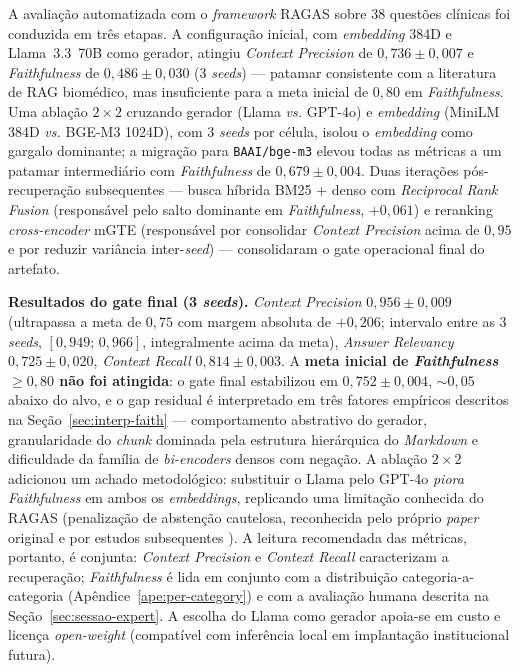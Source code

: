 \documentclass[
  12pt,
  oneside,
  a4paper,
  english,
  brazil
]{abntex2}
\begin{document}
A avaliação automatizada com o \emph{framework} RAGAS sobre 38 questões
clínicas foi conduzida em três etapas. A configuração inicial, com
\emph{embedding} 384D e Llama~3.3~70B como gerador, atingiu
\textit{Context Precision} de $0{,}736 \pm 0{,}007$ e
\textit{Faithfulness} de $0{,}486 \pm 0{,}030$ (3 \emph{seeds}) ---
patamar consistente com a literatura de RAG biomédico, mas insuficiente
para a meta inicial de $0{,}80$ em \textit{Faithfulness}. Uma ablação
$2 \times 2$ cruzando gerador (Llama \textit{vs.} GPT-4o) e
\emph{embedding} (MiniLM 384D \textit{vs.} BGE-M3 1024D), com 3
\emph{seeds} por célula, isolou o \emph{embedding} como gargalo
dominante; a migração para \texttt{BAAI/bge-m3} elevou todas as
métricas a um patamar intermediário com \textit{Faithfulness} de
$0{,}679 \pm 0{,}004$. Duas iterações pós-recuperação subsequentes ---
busca híbrida BM25 + denso com \textit{Reciprocal Rank Fusion}
(responsável pelo salto dominante em \textit{Faithfulness},
$+0{,}061$) e reranking \emph{cross-encoder} mGTE (responsável por
consolidar \textit{Context Precision} acima de $0{,}95$ e por reduzir
variância inter-\emph{seed}) --- consolidaram o gate operacional final
do artefato.

\textbf{Resultados do gate final (3 \emph{seeds}).}
\textit{Context Precision} $0{,}956 \pm 0{,}009$ (ultrapassa a meta de
$0{,}75$ com margem absoluta de $+0{,}206$; intervalo entre as 3
\emph{seeds}, $[0{,}949;\, 0{,}966]$, integralmente acima da meta),
\textit{Answer Relevancy} $0{,}725 \pm 0{,}020$, \textit{Context
Recall} $0{,}814 \pm 0{,}003$. A \textbf{meta inicial de
\textit{Faithfulness} $\geq 0{,}80$ não foi atingida}: o gate final
estabilizou em $0{,}752 \pm 0{,}004$, $\sim 0{,}05$ abaixo do alvo, e
o gap residual é interpretado em três fatores empíricos descritos na
Seção~\ref{sec:interp-faith} --- comportamento abstrativo do gerador,
granularidade do \emph{chunk} dominada pela estrutura hierárquica do
\emph{Markdown} e dificuldade da família de \emph{bi-encoders} densos
com negação. A ablação $2 \times 2$ adicionou um achado metodológico:
substituir o Llama pelo GPT-4o \emph{piora} \textit{Faithfulness} em
ambos os \emph{embeddings}, replicando uma limitação conhecida do
RAGAS (penalização de abstenção cautelosa, reconhecida pelo próprio
\emph{paper} original \cite{es2024} e por estudos subsequentes
\cite{huang2023halucination, zakka2024almanac, ocaf2024}). A leitura
recomendada das métricas, portanto, é conjunta: \textit{Context
Precision} e \textit{Context Recall} caracterizam a recuperação;
\textit{Faithfulness} é lida em conjunto com a distribuição
categoria-a-categoria (Apêndice~\ref{ape:per-category}) e com a
avaliação humana descrita na Seção~\ref{sec:sessao-expert}. A escolha
do Llama como gerador apoia-se em custo e licença \emph{open-weight}
(compatível com inferência local em implantação institucional futura).
\end{document}

